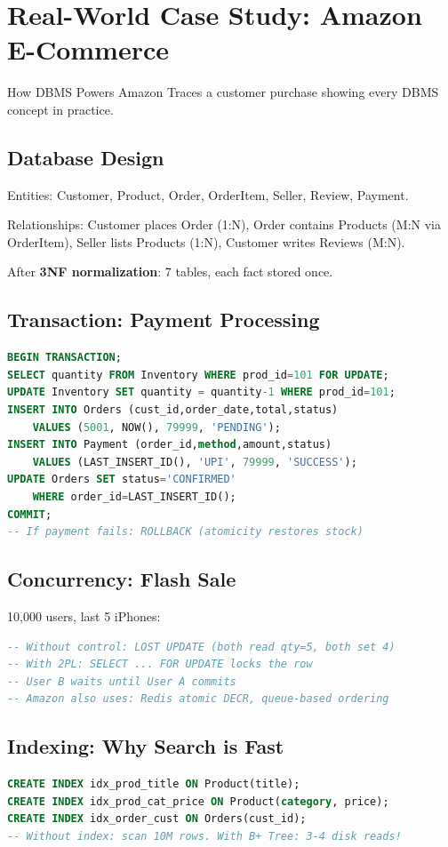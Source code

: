 \documentclass[12pt,a4paper]{article}
\begin{document}
\section{Real-World Case Study: Amazon E-Commerce}

\begin{conceptbox}{How DBMS Powers Amazon}
Traces a customer purchase showing every DBMS concept in practice.
\end{conceptbox}

\subsection{Database Design}
Entities: Customer, Product, Order, OrderItem, Seller, Review, Payment.

Relationships: Customer places Order (1:N), Order contains Products (M:N via OrderItem), Seller lists Products (1:N), Customer writes Reviews (M:N).

After \textbf{3NF normalization}: 7 tables, each fact stored once.

\subsection{Transaction: Payment Processing}
\begin{lstlisting}[language=SQL]
BEGIN TRANSACTION;
SELECT quantity FROM Inventory WHERE prod_id=101 FOR UPDATE;
UPDATE Inventory SET quantity = quantity-1 WHERE prod_id=101;
INSERT INTO Orders (cust_id,order_date,total,status)
    VALUES (5001, NOW(), 79999, 'PENDING');
INSERT INTO Payment (order_id,method,amount,status)
    VALUES (LAST_INSERT_ID(), 'UPI', 79999, 'SUCCESS');
UPDATE Orders SET status='CONFIRMED'
    WHERE order_id=LAST_INSERT_ID();
COMMIT;
-- If payment fails: ROLLBACK (atomicity restores stock)
\end{lstlisting}

\subsection{Concurrency: Flash Sale}
10,000 users, last 5 iPhones:
\begin{lstlisting}[language=SQL]
-- Without control: LOST UPDATE (both read qty=5, both set 4)
-- With 2PL: SELECT ... FOR UPDATE locks the row
-- User B waits until User A commits
-- Amazon also uses: Redis atomic DECR, queue-based ordering
\end{lstlisting}

\subsection{Indexing: Why Search is Fast}
\begin{lstlisting}[language=SQL]
CREATE INDEX idx_prod_title ON Product(title);
CREATE INDEX idx_prod_cat_price ON Product(category, price);
CREATE INDEX idx_order_cust ON Orders(cust_id);
-- Without index: scan 10M rows. With B+ Tree: 3-4 disk reads!
\end{lstlisting}
\end{document}
